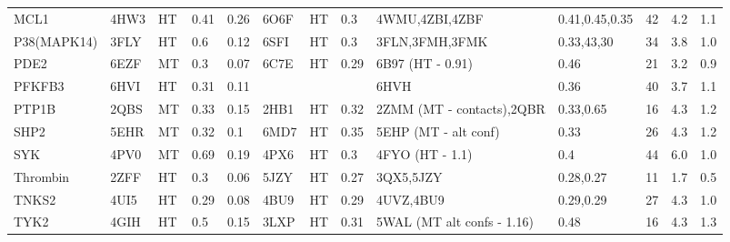 \begin{tabular}{l|l@{ (}l@{ - }l@{) }l|lll|ll|lll}
MCL1       & 4HW3        & HT                     & 0.41          & 0.26 & 6O6F& HT& 0.3   & 4WMU,4ZBI,4ZBF	& 0.41,0.45,0.35 & 42 & 4.2 & 1.1\\
P38(MAPK14)& 3FLY        & HT                     & 0.6           & 0.12 & 6SFI& HT& 0.3  & 3FLN,3FMH,3FMK & 0.33,43,30 & 34 & 3.8 & 1.0\\
PDE2       & 6EZF        & MT                     & 0.3           & 0.07 & 6C7E& HT& 0.29 & 6B97 (HT - 0.91) & 0.46 & 21 & 3.2 & 0.9\\
PFKFB3     & 6HVI        & HT                     & 0.31          & 0.11 &     &   &      & 6HVH & 0.36 & 40 & 3.7 & 1.1\\
PTP1B      & 2QBS        & MT                     & 0.33          & 0.15 & 2HB1& HT& 0.32 & 2ZMM (MT - contacts),2QBR & 0.33,0.65 & 16 & 4.3 & 1.2\\
SHP2       & 5EHR        & MT                     & 0.32          & 0.1  & 6MD7& HT& 0.35 & 5EHP (MT - alt conf) & 0.33 & 26 & 4.3 & 1.2\\
SYK        & 4PV0        & MT                     & 0.69          & 0.19 & 4PX6& HT& 0.3  & 4FYO (HT - 1.1)	& 0.4 & 44 & 6.0 & 1.0\\
Thrombin   & 2ZFF        & HT                     & 0.3           & 0.06 & 5JZY& HT& 0.27 & 3QX5,5JZY &	0.28,0.27 & 11 & 1.7 & 0.5\\
TNKS2      & 4UI5        & HT                     & 0.29          & 0.08 & 4BU9& HT& 0.29 & 4UVZ,4BU9 & 0.29,0.29 & 27 & 4.3 & 1.0\\
TYK2       & 4GIH        & HT                     & 0.5           & 0.15 & 3LXP& HT& 0.31 & 5WAL (MT alt confs - 1.16) & 0.48 & 16 & 4.3 & 1.3\\
\end{tabular}

